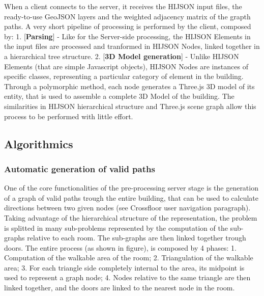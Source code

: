 \documentclass{sig-alternate}
\begin{document}
When a client connects to the server, it receives the HIJSON input
files, the ready-to-use GeoJSON layers and the weighted adjacency matrix
of the grapth paths. A very short pipeline of processing is performed by
the client, composed by: 1. {[}\textbf{Parsing}{]} - Like for the
Server-side processing, the HIJSON Elements in the input files are
processed and tranformed in HIJSON Nodes, linked together in a
hierarchical tree structure. 2. {[}\textbf{3D Model generation}{]} -
Unlike HIJSON Elements (that are simple Javascript objects), HIJSON
Nodes are instances of specific classes, representing a particular
category of element in the building. Through a polymorphic method, each
node generates a Three.js 3D model of its entity, that is used to
assemble a complete 3D Model of the building. The similarities in HIJSON
hierarchical structure and Three.js scene graph allow this process to be
performed with little effort.

\subsection{Algorithmics}\label{algorithmics}

\subsubsection{Automatic generation of valid
paths}\label{automatic-generation-of-valid-paths}

One of the core functionalities of the pre-processing server stage is
the generation of a graph of valid paths trough the entire building,
that can be used to calculate directions between two given nodes (see
Crossfloor user navigation paragraph). Taking advantage of the
hierarchical structure of the representation, the problem is splitted in
many sub-problems represented by the computation of the sub-graphs
relative to each room. The sub-graphs are then linked together trough
doors. The entire process (as shown in figure), is composed by 4 phases:
1. Computation of the walkable area of the room; 2. Triangulation of the
walkable area; 3. For each triangle side completely internal to the
area, its midpoint is used to represent a graph node; 4. Nodes relative
to the same triangle are then linked together, and the doors are linked
to the nearest node in the room.
\end{document}
